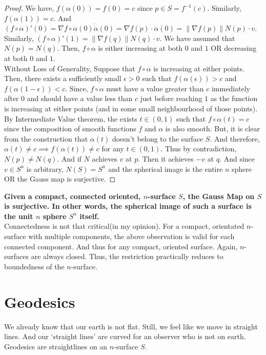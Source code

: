 \begin{proof}
	We have, $f(\alpha(0)) = f(0) = c$ since $p \in S = f^{-1}(c)$. Similarly, $f(\alpha(1)) = c$. And $(f \circ \alpha)'(0) = \nabla f \circ \alpha(0) \dot \dot{\alpha}(0) = \nabla f(p) \cdot \dot{\alpha}(0) = \| \nabla f(p) \| N(p) \cdot v$. Similarly, $(f \circ \alpha)'(1) = \| \nabla f(q) \| N(q) \cdot v$. We have assumed that $N(p) = N(q)$. Then, $f \circ \alpha$ is either increasing at both $0$ and $1$ OR decreasing at both $0$ and $1$.\\

	Without Loss of Generality, Suppose that $f \circ \alpha$ is increasing at either points. Then, there exists a sufficiently small $\epsilon > 0$ such that $f(\alpha(\epsilon)) > c$ and $f(\alpha(1-\epsilon)) < c$. Since, $f \circ \alpha$ must have a value greater than $c$ immediately after $0$ and should have a value less than $c$ just before reaching $1$ as the function is increasing at either points (and in some small neighbourhood of those points).\\

	By Intermediate Value theorem, the exists $t \in (0,1)$ such that $f \circ \alpha(t) = c$ since the composition of smooth functions $f$ and $\alpha$ is also smooth. But, it is clear from the construction that $\alpha(t)$ doesn't belong to the surface $S$. And therefore, $\alpha(t) \ne c \implies f(\alpha(t)) \ne c$ for any $t \in (0,1)$. Thus by contradiction, $N(p) \ne N(q)$. And if $N$ achieves $v$ at $p$. Then it achieves $-v$ at $q$. And since $v \in S^n$ is arbitrary, $N(S) = S^n$ and the spherical image is the entire $n$ sphere OR the Gauss map is surjective.
\end{proof}

	\textbf{Given a compact, connected oriented, $n$-surface $S$, the Gauss Map on $S$ is surjective. In other words, the spherical image of such a surface is the unit $n$ sphere $S^n$ itself.}\\

	Connectedness is not that critical(in my opinion). For a compact, orientated $n$-surface with multiple components, the above observation is valid for each connected component. And thus for any compact, oriented surface. Again, $n$-surfaces are always closed. Thus, the restriction practically reduces to boundedness of the $n$-surface.

\section{Geodesics}
	We already know that our earth is not flat. Still, we feel like we move in straight lines. And our `straight lines' are curved for an observer who is not on earth. Geodesics are straightlines on an $n$-surface $S$.


